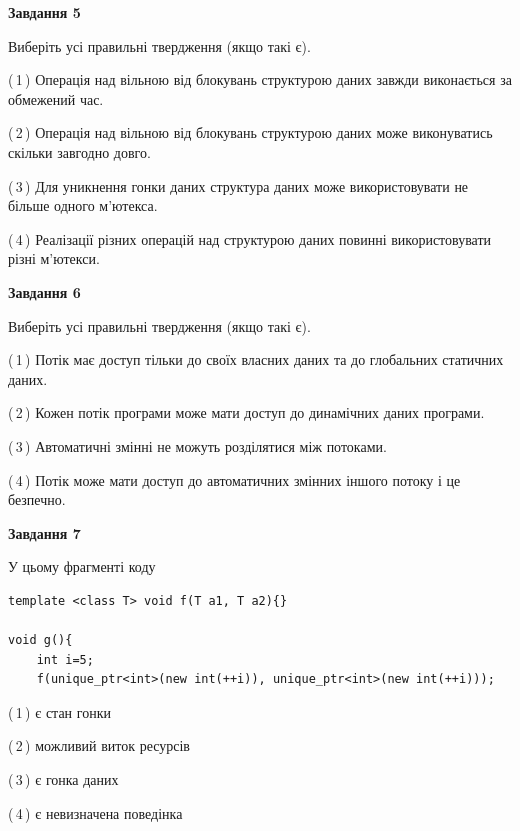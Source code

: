 \documentclass[12pt, ukrainian]{article}
\begin{document}
\begin {large}
{\begin{center}
\textbf{Завдання 5}
\end{center}

Виберіть усі правильні твердження (якщо такі є).\par
\vspace{2mm}

(\,1\,) Операція над вільною від блокувань структурою даних завжди виконається за обмежений час.%

(\,2\,) Операція над вільною від блокувань структурою даних може виконуватись скільки завгодно довго.%

(\,3\,) Для уникнення гонки даних структура даних може використовувати не більше одного м’ютекса.%

(\,4\,) Реалізації різних операцій над структурою даних повинні використовувати різні м’ютекси.%
\newpage


\begin{center}
\textbf{Завдання 6}
\end{center}

Виберіть усі правильні твердження (якщо такі є).\par
\vspace{2mm}

(\,1\,) Потік має доступ тільки до своїх власних даних та до глобальних статичних даних.%

(\,2\,) Кожен потік програми може мати доступ до динамічних даних програми.%

(\,3\,) Автоматичні змінні не можуть розділятися між потоками.%

(\,4\,) Потік може мати доступ до автоматичних змінних іншого потоку і це безпечно.%


\begin{center}
\textbf{Завдання 7}
\end{center}

У цьому фрагменті коду
\begin{verbatim}
template <class T> void f(T a1, T a2){}

void g(){
    int i=5;
    f(unique_ptr<int>(new int(++i)), unique_ptr<int>(new int(++i)));
\end{verbatim}

(\,1\,) є стан гонки%

(\,2\,) можливий виток ресурсів%

(\,3\,) є гонка даних%

(\,4\,) є невизначена поведінка%

}
\end {large}

\vspace{4mm}
\newpage
\end{document}
